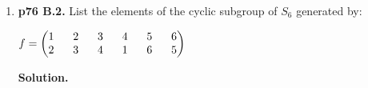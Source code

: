 \documentclass[11pt]{article}
\begin{document}
\begin{enumerate}
\newpage

\item {\bfseries p76 B.2.} List the elements of the cyclic subgroup of $S_6$ generated by:

	$f = \begin{pmatrix}
		1 \hspace{6mm} 2 \hspace{6mm} 3 \hspace{6mm} 4 \hspace{6mm} 5 \hspace{6mm} 6 \\
		2 \hspace{6mm} 3 \hspace{6mm} 4 \hspace{6mm} 1 \hspace{6mm} 6 \hspace{6mm} 5
	\end{pmatrix}$
  
	{\bfseries Solution.}

\end{enumerate}
\end{document}
